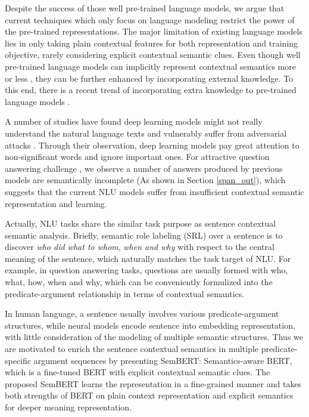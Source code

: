 \documentclass[letterpaper]{article} \usepackage{aaai20}  \usepackage{times}  \usepackage{helvet} \usepackage{courier}  \usepackage[hyphens]{url}  \usepackage{graphicx} \urlstyle{rm} \def\UrlFont{\rm}  \usepackage{graphicx}  \frenchspacing  \usepackage{amssymb}
\begin{document}
Despite the success of those well pre-trained language models, we argue that current techniques which only focus on language modeling restrict the power of the pre-trained representations. The major limitation of existing language models lies in only taking plain contextual features for both representation and training objective, rarely considering explicit contextual semantic clues. Even though well pre-trained language models can implicitly represent contextual semantics more or less \cite{clark2019does}, they can be further enhanced by incorporating external knowledge. To this end, there is a recent trend of incorporating extra knowledge to pre-trained language models \cite{zhang2019sg}.

A number of studies have found deep learning models might not really understand the natural language texts \cite{Mudrakarta2018Did} and vulnerably suffer from adversarial attacks \cite{Jia2017Adversarial}. Through their observation, deep learning models pay great attention to non-significant words and ignore important ones. For attractive question answering challenge \cite{Rajpurkar2016SQuAD}, we observe a number of answers produced by previous models are semantically incomplete (As shown in Section \ref{span_out}), which suggests that the current NLU models suffer from insufficient contextual semantic representation and learning.

Actually, NLU tasks share the similar task purpose as sentence contextual semantic analysis. Briefly,  
semantic role labeling (SRL) over a sentence is to discover \emph{who did what to whom}, \emph{when and why} with respect to the central meaning of the sentence, which naturally matches the task target of NLU. For example, in question answering tasks, questions are usually formed with who, what, how, when and why, which can be conveniently formulized into the predicate-argument relationship in terms of contextual semantics.

In human language, a sentence usually involves various predicate-argument structures, while neural models encode sentence into embedding representation, with little consideration of the modeling of multiple semantic structures. Thus we are motivated to enrich the sentence contextual semantics in multiple predicate-specific argument sequences by presenting SemBERT: Semantics-aware BERT, which is a fine-tuned BERT with explicit contextual semantic clues. The proposed SemBERT learns the representation in a fine-grained manner and takes both strengths of BERT on plain context representation and explicit semantics for deeper meaning representation.
\end{document}
